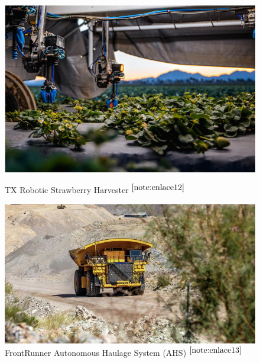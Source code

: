 \begin{figure}[ht!]
	\centering
	\begin{minipage}{0.3\linewidth}
		\centering
		\includegraphics[width=\linewidth]{figs/strawberry.png}
		\caption*{\centering TX Robotic Strawberry Harvester $^{\ref{note:enlace12}}$ }
	\end{minipage}
	\hspace{3 cm}
	\begin{minipage}{0.3\linewidth}
		\centering
		\includegraphics[width=\linewidth]{figs/komatsu.jpeg}
		\caption*{\centering FrontRunner Autonomous Haulage System (AHS) $^{\ref{note:enlace13}}$ }
	\end{minipage}
	\hspace{3cm}
	\begin{minipage}{0.3\linewidth}
		\centering

\end{minipage}
\end{figure}
